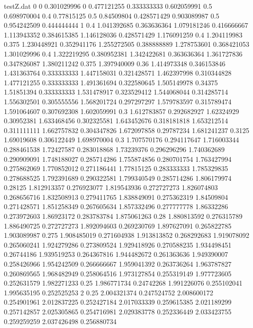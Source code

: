 \begin{filecontents*}{testZ.dat}
0  0
0.301029996  0
0.477121255  0.333333333
0.602059991  0.5
0.698970004  0.4
0.77815125  0.5
0.84509804  0.428571429
0.903089987  0.5
0.954242509  0.444444444
1  0.4
1.041392685  0.363636364
1.079181246  0.416666667
1.113943352  0.384615385
1.146128036  0.428571429
1.176091259  0.4
1.204119983  0.375
1.230448921  0.352941176
1.255272505  0.388888889
1.278753601  0.368421053
1.301029996  0.4
1.322219295  0.380952381
1.342422681  0.363636364
1.361727836  0.347826087
1.380211242  0.375
1.397940009  0.36
1.414973348  0.346153846
1.431363764  0.333333333
1.447158031  0.321428571
1.462397998  0.310344828
1.477121255  0.333333333
1.491361694  0.322580645
1.505149978  0.34375
1.51851394  0.333333333
1.531478917  0.323529412
1.544068044  0.314285714
1.556302501  0.305555556
1.568201724  0.297297297
1.579783597  0.315789474
1.591064607  0.307692308
1.602059991  0.3
1.612783857  0.292682927
1.62324929  0.30952381
1.633468456  0.302325581
1.643452676  0.318181818
1.653212514  0.311111111
1.662757832  0.304347826
1.672097858  0.29787234
1.681241237  0.3125
1.69019608  0.306122449
1.698970004  0.3
1.707570176  0.294117647
1.716003344  0.288461538
1.72427587  0.283018868
1.73239376  0.296296296
1.740362689  0.290909091
1.748188027  0.285714286
1.755874856  0.280701754
1.763427994  0.275862069
1.770852012  0.271186441
1.77815125  0.283333333
1.785329835  0.278688525
1.792391689  0.290322581
1.799340549  0.285714286
1.806179974  0.28125
1.812913357  0.276923077
1.819543936  0.272727273
1.826074803  0.268656716
1.832508913  0.279411765
1.838849091  0.275362319
1.84509804  0.271428571
1.851258349  0.267605634
1.857332496  0.277777778
1.86332286  0.273972603
1.86923172  0.283783784
1.875061263  0.28
1.880813592  0.276315789
1.886490725  0.272727273
1.892094603  0.269230769
1.897627091  0.265822785
1.903089987  0.275
1.908485019  0.271604938
1.913813852  0.268292683
1.919078092  0.265060241
1.924279286  0.273809524
1.929418926  0.270588235
1.934498451  0.26744186
1.939519253  0.264367816
1.944482672  0.261363636
1.949390007  0.258426966
1.954242509  0.266666667
1.959041392  0.263736264
1.963787827  0.260869565
1.968482949  0.258064516
1.973127854  0.255319149
1.977723605  0.252631579
1.982271233  0.25
1.986771734  0.24742268
1.991226076  0.255102041
1.995635195  0.252525253
2  0.25
2.004321374  0.247524752
2.008600172  0.254901961
2.012837225  0.252427184
2.017033339  0.259615385
2.021189299  0.257142857
2.025305865  0.254716981
2.029383778  0.252336449
2.033423755  0.259259259
2.037426498  0.256880734

\end{filecontents*}
